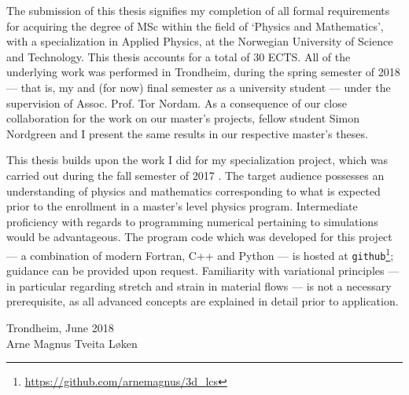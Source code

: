 The submission of this thesis signifies my completion of all formal
requirements for acquiring the degree of MSc within the field of `Physics and
Mathematics', with a specialization in Applied Physics, at the Norwegian
University of Science and Technology. This thesis accounts for a total of 30
ECTS. All of the underlying work was performed in Trondheim, during the spring
semester of 2018 --- that is, my  and (for now) final semester as a
university student --- under the supervision of Assoc. Prof. Tor Nordam. As a
consequence of our close collaboration for the work on our master's projects,
fellow student Simon Nordgreen and I present the same results in our respective
master's theses.

This thesis builds upon the work I did for my specialization project, which was
carried out during the fall semester of 2017 \parencite{loken2017sensitivity}.
The target audience possesses an understanding of physics and mathematics
corresponding to what is expected prior to the enrollment in a master's level
physics program. Intermediate proficiency with regards to programming numerical
pertaining to simulations would be advantageous. The program code which was
developed for this project --- a combination of modern Fortran, C++ and
Python --- is hosted at
\texttt{github}\footnote{\url{https://github.com/arnemagnus/3d_lcs}}; guidance
can be provided upon request. Familiarity with variational principles --- in
particular regarding stretch and strain in material flows --- is not a
necessary prerequisite, as all advanced concepts are explained in detail prior
to application.


\begin{minipage}[t]{\textwidth}
    \begin{flushright}
    Trondheim, June 2018\\
    Arne Magnus Tveita Løken
    \end{flushright}
\end{minipage}
